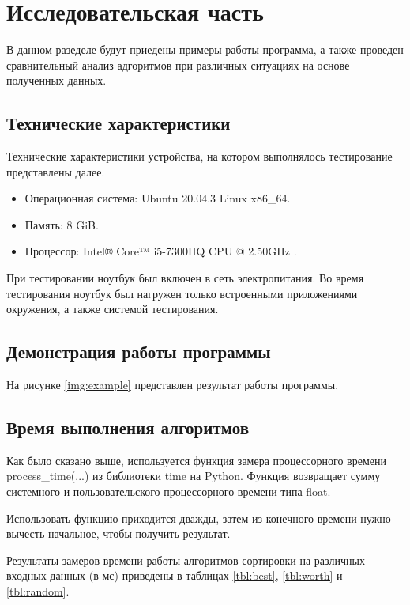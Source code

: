 \chapter{Исследовательская часть}

В данном разеделе будут приедены примеры работы программа, а также проведен сравнительный анализ адгоритмов при различных ситуациях на основе полученных данных.

\section{Технические характеристики}

Технические характеристики устройства, на котором выполнялось тестирование представлены далее.

\begin{itemize}
    \item Операционная система: Ubuntu 20.04.3 \cite{ubuntu} Linux \cite{linux} x86\_64.
    \item Память: 8 GiB.
    \item Процессор: Intel® Core™ i5-7300HQ CPU @ 2.50GHz \cite{intel}.
\end{itemize}

При тестировании ноутбук был включен в сеть электропитания. Во время тестирования ноутбук был нагружен только встроенными приложениями окружения, а также системой тестирования.

\section{Демонстрация работы программы}

На рисунке \ref{img:example} представлен результат работы программы.

\clearpage

\section{Время выполнения алгоритмов}

Как было сказано выше, используется функция замера процессорного времени process\_time(...) из библиотеки time на Python. Функция возвращает сумму системного и пользовательского процессорного времени типа float.

Использовать функцию приходится дважды, затем из конечного времени нужно вычесть начальное, чтобы получить результат.

Результаты замеров времени работы алгоритмов сортировки на различных входных данных (в мс) приведены в таблицах \ref{tbl:best}, \ref{tbl:worth} и \ref{tbl:random}.

